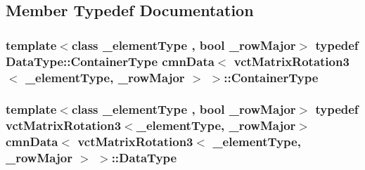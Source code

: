 \subsection{Member Typedef Documentation}
\hypertarget{classcmn_data_3_01vct_matrix_rotation3_3_01__element_type_00_01__row_major_01_4_01_4_a220f0a68d567275fede9e0124441ae86}{}
\subsubsection[{Container\+Type}]{\setlength{\rightskip}{0pt plus 5cm}template$<$class \+\_\+element\+Type , bool \+\_\+row\+Major$>$ typedef {\bf Data\+Type\+::\+Container\+Type} {\bf cmn\+Data}$<$ {\bf vct\+Matrix\+Rotation3}$<$ \+\_\+element\+Type, \+\_\+row\+Major $>$ $>$\+::{\bf Container\+Type}}\label{classcmn_data_3_01vct_matrix_rotation3_3_01__element_type_00_01__row_major_01_4_01_4_a220f0a68d567275fede9e0124441ae86}
\hypertarget{classcmn_data_3_01vct_matrix_rotation3_3_01__element_type_00_01__row_major_01_4_01_4_a16ee28dba714864959664e5a1567db82}{}
\subsubsection[{Data\+Type}]{\setlength{\rightskip}{0pt plus 5cm}template$<$class \+\_\+element\+Type , bool \+\_\+row\+Major$>$ typedef {\bf vct\+Matrix\+Rotation3}$<$\+\_\+element\+Type, \+\_\+row\+Major$>$ {\bf cmn\+Data}$<$ {\bf vct\+Matrix\+Rotation3}$<$ \+\_\+element\+Type, \+\_\+row\+Major $>$ $>$\+::{\bf Data\+Type}}\label{classcmn_data_3_01vct_matrix_rotation3_3_01__element_type_00_01__row_major_01_4_01_4_a16ee28dba714864959664e5a1567db82}


